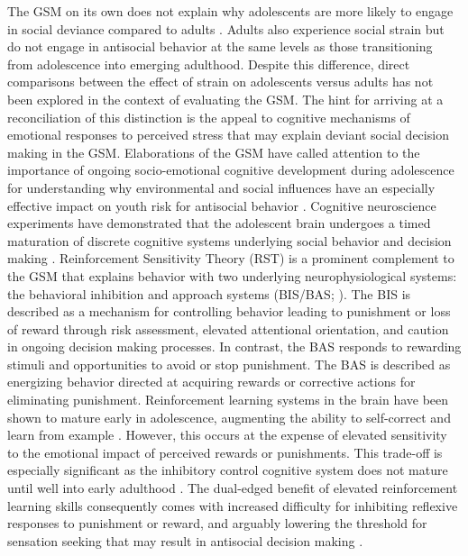 \documentclass[utf8]{article}
\begin{document}
The GSM on its own does not explain why adolescents are more likely to engage in social deviance compared to adults \citep{froggio2007strain,agnew2012reflection}. Adults also experience social strain but do not engage in antisocial behavior at the same levels as those transitioning from adolescence into emerging adulthood. Despite this difference, direct comparisons between the effect of strain on adolescents versus adults has not been explored in the context of evaluating the GSM. The hint for arriving at a reconciliation of this distinction is the appeal to cognitive mechanisms of emotional responses to perceived stress that may explain deviant social decision making in the GSM. Elaborations of the GSM have called attention to the importance of ongoing socio-emotional cognitive development during adolescence for understanding why environmental and social influences have an especially effective impact on youth risk for antisocial behavior \citep{hasking2007reinforcement}. Cognitive neuroscience experiments have demonstrated that the adolescent brain undergoes a timed maturation of discrete cognitive systems underlying social behavior and decision making \citep{CaseyEtAl2008}. Reinforcement Sensitivity Theory (RST) is a prominent complement to the GSM that explains behavior with two underlying neurophysiological systems: the behavioral inhibition and approach systems (BIS/BAS; \cite{carver1994behavioral,gray1970psychophysiological}). The BIS is described as a mechanism for controlling behavior leading to punishment or loss of reward through risk assessment, elevated attentional orientation, and caution in ongoing decision making processes. In contrast, the BAS responds to rewarding stimuli and opportunities to avoid or stop punishment. The BAS is described as energizing behavior directed at acquiring rewards or corrective actions for eliminating punishment. Reinforcement learning systems in the brain have been shown to mature early in adolescence, augmenting the ability to self-correct and learn from example \citep{somerville2010time}. However, this occurs at the expense of elevated sensitivity to the emotional impact of perceived rewards or punishments. This trade-off is especially significant as the inhibitory control cognitive system does not mature until well into early adulthood \citep{somerville2010developmental}. The dual-edged benefit of elevated reinforcement learning skills consequently comes with increased difficulty for inhibiting reflexive responses to punishment or reward, and arguably lowering the threshold for sensation seeking that may result in antisocial decision making \citep{LunaWright2016}. 
\end{document}

